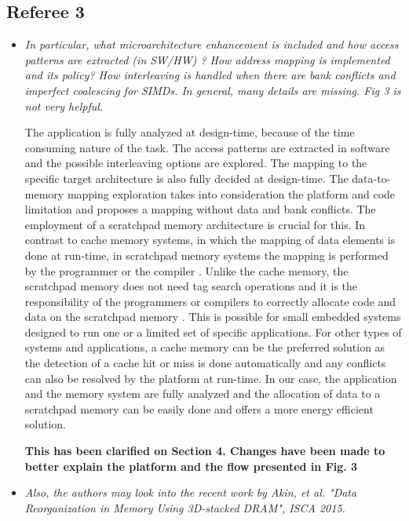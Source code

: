 \documentclass[12pt,a4paper,notitlepage]{article}
\begin{document}
\subsection*{Referee 3}

\begin{itemize}

\item \textit{In particular, what microarchitecture enhancement is included and how access patterns are extracted (in SW/HW) ?  How address mapping is implemented and its policy?  How interleaving is handled when there are bank conflicts and imperfect coalescing for SIMDs.  In general,  many details are missing.  Fig 3 is not very helpful.}

The application is fully analyzed at design-time, because of the time consuming nature of the task. 
The access patterns are extracted in software and the possible interleaving options are explored. 
The mapping to the specific target architecture is also fully decided at design-time.
The data-to-memory mapping exploration takes into consideration the platform and code limitation and proposes a mapping without data and bank conflicts.
The employment of a scratchpad memory architecture is crucial for this.
In contrast to cache memory systems, in which the mapping of data elements is done at run-time, in scratchpad memory systems the mapping is performed by the programmer or the compiler \cite{ishitobi2007code}. 
Unlike the cache memory, the scratchpad memory does not need tag search operations and it is the responsibility of the programmers or compilers to correctly allocate code and data on the scratchpad memory \cite{steinke2002assigning}.
This is possible for small embedded systems designed to run one or a limited set of specific applications. 
For other types of systems and applications, a cache memory can be the preferred solution as the detection of a cache hit or miss is done automatically and any conflicts can also be resolved by the platform at run-time.
In our case, the application and the memory system are fully analyzed and the allocation of data to a scratchpad memory can be easily done and offers a more energy efficient solution.

\textbf{This has been clarified on Section 4. Changes have been made to better explain the platform and the flow presented in Fig. 3}

\item \textit{Also, the authors may look into the recent work by Akin, et al. "Data Reorganization in Memory Using 3D-stacked DRAM", ISCA 2015.}


\end{itemize}
\end{document}
